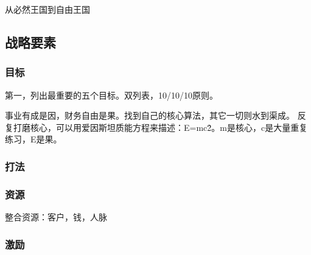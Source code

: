 从必然王国到自由王国

\subsection{战略要素}

\subsubsection{目标}

第一，列出最重要的五个目标。双列表，10/10/10原则。

事业有成是因，财务自由是果。找到自己的核心算法，其它一切则水到渠成。
反复打磨核心，可以用爱因斯坦质能方程来描述：E=mc\^2。m是核心，c是大量重复练习，E是果。

\subsubsection{打法}

\subsubsection{资源}

整合资源：客户，钱，人脉

\subsubsection{激励}
